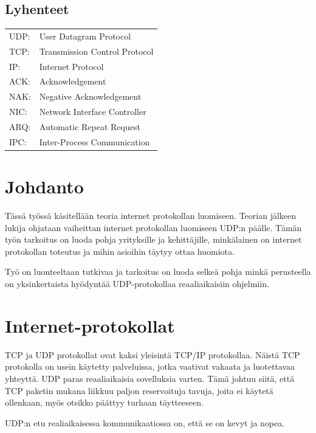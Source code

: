 \documentclass[a4paper,12pt]{article}
\begin{document}
\begin{titlepage}
        \tableofcontents
        \newpage
        \thispagestyle{empty}


        \section*{Lyhenteet}
        \begin{tabular}{l l}
            UDP: & User Datagram Protocol        \\
            TCP: & Transmission Control Protocol \\
            IP:  & Internet Protocol             \\
            ACK: & Acknowledgement               \\
            NAK: & Negative Acknowledgement      \\
            NIC: & Network Interface Controller  \\
            ARQ: & Automatic Repeat Request      \\
            IPC: & Inter-Process Communication   \\
        \end{tabular}
        \newpage


    \end{titlepage}


    \section{Johdanto}\label{sec:johdanto}
    Tässä työssä käsitellään teoria internet protokollan luomiseen. Teorian jälkeen lukija ohjataan vaiheittan internet protokollan luomiseen UDP:n päälle. Tämän työn tarkoitus on luoda pohja yrityksille ja kehittäjille, minkälainen on internet protokollan toteutus ja mihin asioihin täytyy ottaa huomiota.
    \par Työ on luonteeltaan tutkivaa ja tarkoitus on luoda selkeä pohja minkä perusteella on yksinkertaista hyödyntää UDP-protokollaa reaaliaikaisiin ohjelmiin.


    \section{Internet-protokollat}
    TCP ja UDP protokollat ovat kaksi yleisintä TCP/IP protokollaa.
    Näistä TCP protokolla on usein käytetty palveluissa, jotka vaativat vakaata ja luotettavaa yhteyttä. UDP paras reaaliaikaisia sovelluksia varten. Tämä johtuu siitä, että TCP paketin mukana liikkuu paljon reservoituja tavuja, joita ei käytetä ollenkaan, myös otsikko päättyy turhaan täytteeseen.
    \par
    UDP:n etu realiaikaisessa kommunikaatiossa on, että se on kevyt ja nopea.
    \cite{KumarSurveyUDP}
    \par
\end{document}
